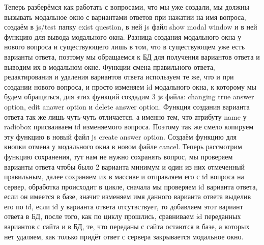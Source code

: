 \documentclass[12pt, oldlfont, amsfonts]{report}
\begin{document}
Теперь разберёмся как работать с вопросами, что мы уже создали, мы должны вызывать модальное окно с вариантами ответов при нажатии на имя вопроса, создаём в { js/test} папку { exist question}, в ней js файл { show modal window} и в ней функцию для вывода модального окна. Разница создания модального окна у нового вопроса и существующего лишь в том, что в существующем уже есть варианты ответа, поэтому мы обращаемся к БД для получения вариантов ответа и выводим их в модальном окне. Функции смена правильного ответа, редактирования и удаления вариантов ответа используем те же, что и при создании нового вопроса, и просто изменяем id модального окна, к которому мы будем обращаться, для этих функций создадим 3 js файла: { changing true answer option}, { edit anawer option} и { delete answer option}. Функция создания варианта ответа так же лишь чуть-чуть отличается, а именно тем, что атрибуту name у radiobox присваиваем id изменяемого вопроса. Поэтому так же смело копируем эту функцию в новый файл js { create answer option}. Создаём функцию для кнопки отмена у модального окна в новом файле { cancel}. Теперь рассмотрим функцию сохранения, тут нам не нужно сохранять вопрос, мы проверяем варианты ответа чтобы было 2 варианта минимум и один из них отмеченный правильным, далее сохраняем их в массиве и отправляем его с id вопроса на сервер, обработка происходит в цикле, сначала мы проверяем id варианта ответа, если он имеется в базе, значит изменяем имя данного варианта ответа выделив его по id, если id у варианта ответа отсутвствует, то добавляем этот вариант ответа в БД, после того, как по циклу прошлись, сравниваем id переданных вариантов с сайта и в БД, те, что переданы с сайта остаются в базе, а которых нет удаляем, как только придёт ответ с сервера закрывается модальное окно.


  
\end{document}
